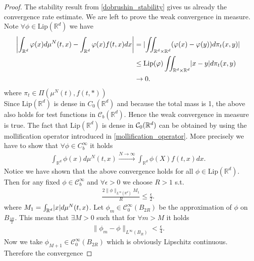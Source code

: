 \begin{proof}
  The stability result from  \autoref{dobrushin_stability} gives us already the convergence rate estimate. We are left 
  to prove the weak convergence in measure. Note $\forall \phi \in \text{Lip}(\mathbb{R}^{d} )$ we have
  \begin{align*}
    \abs*{\int_{\mathbb{R}^{d} }\phi(x)d\mu ^{N}(t,x) -\int_{\mathbb{R}^{d}}\phi(x)f(t,x) dx} &= \abs{\iint_{\mathbb{R}^{d} \times  \mathbb{R}^{d}  } (\phi(x) - \phi(y)) d\pi_t(x,y)}\\
                                                                                              &\le \text{Lip}(\phi ) \iint_{\mathbb{R}^{d}\times \mathbb{R}^{d}  }\abs{x-y}d\pi_t(x,y)\\
                                                                                              &\to 0
  .\end{align*}
  where $\pi_t \in  \Pi(\mu ^{N}(t),f(t,*) )$\\[1ex]
  Since $\text{Lip}(\mathbb{R}^{d} )$ is dense in $C_{0}(\mathbb{R}^{d} )$ and because the total mass is 1, the above also holds for test functions in 
  $\mathcal{C}_b(\mathbb{R}^{d} )$. Hence the weak convergence in measure is true. The fact that $\text{Lip}(\mathbb{R}^{d} )$ is dense in $\mathcal{C}_0(\R^d)$ 
  can be obtained by using the mollification operator introduced in \autoref{mollification_operator}. More precisely we have to show that $\forall  \phi \in C_b^{\infty} $ it holds 
  \begin{align*}
    \int_{\mathbb{R}^{d} }\phi(x) d\mu ^{N}(t,x)  \xrightarrow{N\to \infty} \int_{\mathbb{R}^{d} }\phi(X)f(t,x)dx
  .\end{align*}
  Notice we have shown that the above convergence holds for all $\phi  \in  \text{Lip}(\mathbb{R}^{d} )$. Then for any fixed $ \phi  \in  \mathcal{C}_b^{\infty} $ and $\forall \epsilon > 0$ we choose $R>1$ s.t.
  \begin{align*}
    \frac{2 \|\phi \|_{L^{\infty}(\mathbb{R}^{d} ) }M_1}{R} \le  \frac{\epsilon}{2}
  .\end{align*}
  where $M_{1} = \int_{\mathbb{R}^{d} } \abs{x} d\mu ^{N}(t,x) $. Let $\phi_m \in \mathcal{C}_0^{\infty}(B_{2R}) $ be the approximation of $\phi $ on $B_{\frac{3R}{2}}$. This means
  that $\exists  M > 0$ such that for $\forall m > M$ it holds 
  \begin{align*}
    \|\phi_m - \phi \|_{L^{\infty}(B_R) } < \frac{\epsilon}{4}
  .\end{align*}
  Now we take $\phi_{M+1} \in  \mathcal{C}_0^{\infty}(B_{2R}) $ which is obviously Lipschitz continuous. Therefore the convergence 

\end{proof}

